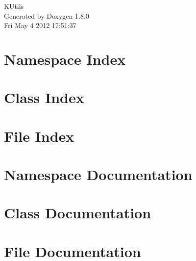 \documentclass{book}
\begin{document}
\hypersetup{pageanchor=false,citecolor=blue}
\begin{titlepage}
\vspace*{7cm}
\begin{center}
{\Large K\-Utils }\\
\vspace*{1cm}
{\large Generated by Doxygen 1.8.0}\\
\vspace*{0.5cm}
{\small Fri May 4 2012 17:51:37}\\
\end{center}
\end{titlepage}
\clearemptydoublepage
{}
\tableofcontents
\clearemptydoublepage
{}
\hypersetup{pageanchor=true,citecolor=blue}
\chapter{Namespace Index}

\chapter{Class Index}

\chapter{File Index}

\chapter{Namespace Documentation}















\chapter{Class Documentation}











\chapter{File Documentation}


















\printindex
\end{document}
